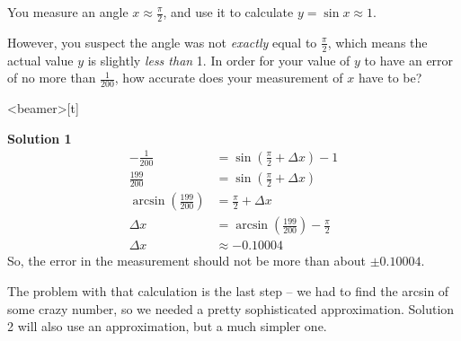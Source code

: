\begin{frame}[t]

\AnswerSpace{}
You measure an angle $x \approx \frac{\pi}{2}$, and use it to calculate $y = \sin x \approx 1$.

However, you suspect the angle was not \textit{exactly} equal to $\frac{\pi}{2}$, which means the actual value $y$ is slightly \textit{less than} 1. In order for your value of $y$ to have an error of no more than $\frac1{200}$, how accurate does your measurement of $x$ have to be?
\color{answercolor}
\end{frame}
\begin{frame}<beamer>[t]
\color{answercolor}

\textbf{Solution 1} 
\begin{align*}
-\frac{1}{200}&=\sin \left(\frac{\pi}{2}+\Delta x\right) - 1\\
\frac{199}{200}&=\sin\left(\frac{\pi}{2}+\Delta x\right)\\
\arcsin\left(\frac{199}{200}\right)&=\frac{\pi}{2}+\Delta x\\
\Delta x &=\arcsin\left(\frac{199}{200}\right)-\frac{\pi}{2}\\
\Delta x & \approx -0.10004
\end{align*}
So, the error in the measurement should not be more than about $\pm 0.10004$.

The problem with that calculation is the last step -- we had to find the arcsin of some crazy number, so we needed a pretty sophisticated approximation. Solution 2 will also use an approximation, but a much simpler one.

\end{frame}
